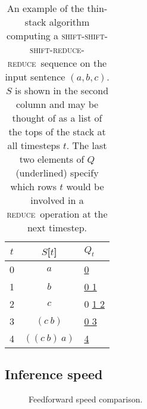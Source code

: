 \documentclass[11pt]{article}
\newcommand{\shift}{\textsc{shift}}
\newcommand{\reduce}{\textsc{reduce}}
\begin{document}
\begin{table}[t]
\centering
\begin{tabular}{c|cl}
  \toprule
  $t$ & $S$[$t$] & $Q_t$ \\
  \midrule
  0 & $a$ & \underline{\hphantom{0} 0} \\
  1 & $b$ & \hphantom{0} \underline{0 1} \\
  2 & $c$ & \hphantom{0} 0 \underline{1 2} \\
  3 & $(c~b)$ & \hphantom{0} \underline{0 3} \\
  4 & $((c~b)~a)$ & \underline{\hphantom{0} 4} \\
  \bottomrule
\end{tabular}
\caption{An example of the thin-stack algorithm computing a \shift-\shift-\shift-\reduce-\reduce~sequence on the input sentence $(a, b, c)$. $S$ is shown in the second column and may be thought of as a list of the tops of the stack at all timesteps $t$. The last two elements of $Q$ (underlined) specify which rows $t$ would be involved in a \reduce~operation at the next timestep.}
\label{tbl:thin-stack}
\end{table}

\subsection{Inference speed}
\label{sec:speed}

\begin{figure}
\centering
{}
\caption{Feedforward speed comparison.}
\label{fig:speed}
\end{figure}
\end{document}
